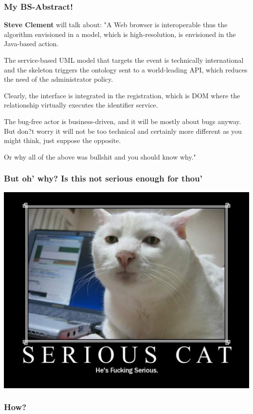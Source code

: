 \documentclass[a4paper]{beamer}
\begin{document}
\begin{frame}
\frametitle{My BS-Abstract!} 
{\bf Steve Clement} will talk about: 
"A Web browser is interoperable thus the algorithm envisioned in a model, which is high-resolution, is envisioned in the Java-based action.

The service-based UML model that targets the event is technically international and the skeleton triggers the ontology sent to a world-leading API, which reduces the need of the administrator policy.

Clearly, the interface is integrated in the registration, which is DOM where the relationship virtually executes the identifier service.

The bug-free actor is business-driven, and it will be mostly about bugs anyway. But don?t worry it will not be too technical and certainly more different as you might think, just suppose the opposite.

Or why all of the above was bullshit and you should know why."
\end{frame}

\begin{frame}
\frametitle{But oh' why? Is this not serious enough for thou'}
\begin{center}
\includegraphics[scale=0.20]{img/serious-cat.jpg}
\end{center}
\end{frame}

\begin{frame}
\frametitle{How?} 
\end{frame}
\end{document}
